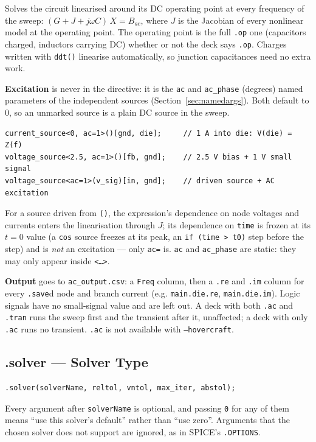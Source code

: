 \documentclass[11pt, a4paper]{article}
\newcommand{\code}[1]{\texttt{\small #1}}
\begin{document}
Solves the circuit linearised around its DC operating point at every
frequency of the sweep: $(G + J + j\omega C)\,X = B_{ac}$, where $J$ is the
Jacobian of every nonlinear model at the operating point. The operating
point is the full \code{.op} one (capacitors charged, inductors carrying DC)
whether or not the deck says \code{.op}. Charges written with \code{ddt()}
linearise automatically, so junction capacitances need no extra work.

\textbf{Excitation} is never in the directive: it is the \code{ac} and
\code{ac\_phase} (degrees) named parameters of the independent sources
(Section~\ref{sec:namedargs}). Both default to 0, so an unmarked source is a
plain DC source in the sweep.

\begin{lstlisting}
current_source<0, ac=1>()[gnd, die];     // 1 A into die: V(die) = Z(f)
voltage_source<2.5, ac=1>()[fb, gnd];    // 2.5 V bias + 1 V small signal
voltage_source<ac=1>(v_sig)[in, gnd];    // driven source + AC excitation
\end{lstlisting}

For a source driven from \code{()}, the expression's dependence on node
voltages and currents enters the linearisation through $J$; its dependence on
\code{time} is frozen at its $t=0$ value (a \code{cos} source freezes at its
peak, an \code{if (time > t0)} step before the step) and is \textit{not} an
excitation --- only \code{ac=} is. \code{ac} and \code{ac\_phase} are static:
they may only appear inside \code{<\dots>}.

\textbf{Output} goes to \code{ac\_output.csv}: a \code{Freq} column, then a
\code{.re} and \code{.im} column for every \code{.save}d node and branch
current (e.g. \code{main.die.re}, \code{main.die.im}). Logic signals have no
small-signal value and are left out. A deck with both \code{.ac} and
\code{.tran} runs the sweep first and the transient after it, unaffected; a
deck with only \code{.ac} runs no transient. \code{.ac} is not available with
\code{--hovercraft}.
\newpage
\subsection{.solver --- Solver Type}
\begin{lstlisting}
.solver(solverName, reltol, vntol, max_iter, abstol);
\end{lstlisting}
Every argument after \code{solverName} is optional, and passing \code{0}
for any of them means ``use this solver's default'' rather than ``use
zero''. Arguments that the chosen solver does not support are ignored, as
in SPICE's \code{.OPTIONS}.
\end{document}
